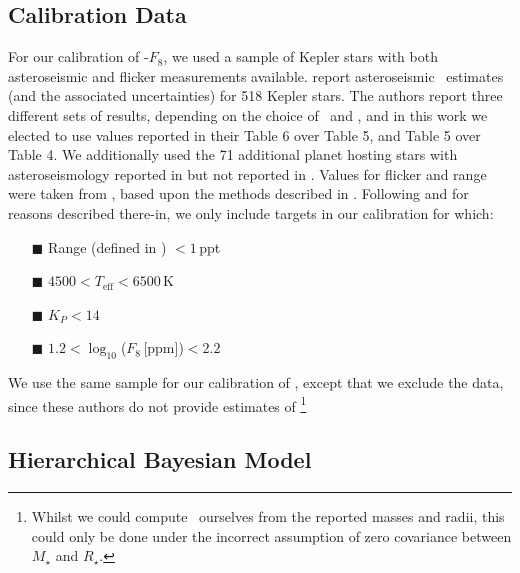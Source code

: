 
\subsection{Calibration Data}

For our calibration of \rhostar-$F_8$, we used a sample of Kepler stars with
both asteroseismic and flicker measurements available. \citet{chaplin:2014}
report asteroseismic \rhostar\ estimates (and the associated uncertainties) for
518 Kepler stars. The authors report three different sets of results, depending
on the choice of \Teff\ and \FeH, and in this work we elected to use values
reported in their Table 6 over Table 5, and Table 5 over Table 4. We
additionally used the 71 additional planet hosting stars with asteroseismology
reported in \citet{huber:2013} but not reported in \citet{chaplin:2014}. Values
for flicker and range were taken from \citet{kipping:2014}, based upon the
methods described in \citet{bastien:2013}. Following \citet{kipping:2014} and
for reasons described there-in, we only include targets in our calibration for
which:

\begin{itemize}
\item[{\tiny$\blacksquare$}] Range (defined in \citealt{bastien:2013})
$<1$\,ppt
\item[{\tiny$\blacksquare$}] $4500<T_{\mathrm{eff}}<6500$\,K
\item[{\tiny$\blacksquare$}] $K_P<14$
\item[{\tiny$\blacksquare$}] $1.2 < \log_{10}$($F_8$\,[ppm])$< 2.2$
\end{itemize}

We use the same sample for our calibration of \logg, except that we exclude the
\citet{huber:2013} data, since these authors do not provide estimates of
\logg\footnote{Whilst we could compute \logg\ ourselves from the reported
masses and radii, this could only be done under the incorrect assumption of
zero covariance between $M_{\star}$ and $R_{\star}$.}

\subsection{Hierarchical Bayesian Model}

